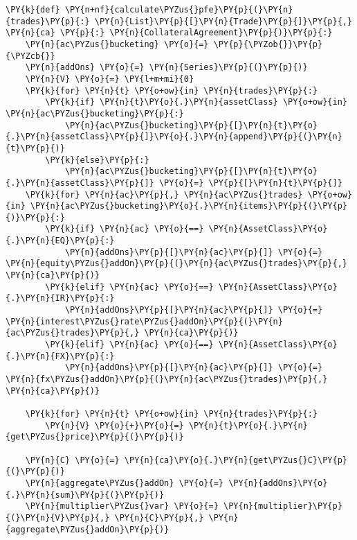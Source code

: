     \begin{tcolorbox}[breakable, size=fbox, boxrule=1pt, pad at break*=1mm,colback=cellbackground, colframe=cellborder]
\begin{Verbatim}[commandchars=\\\{\}]
\PY{k}{def} \PY{n+nf}{calculate\PYZus{}pfe}\PY{p}{(}\PY{n}{trades}\PY{p}{:} \PY{n}{List}\PY{p}{[}\PY{n}{Trade}\PY{p}{]}\PY{p}{,} \PY{n}{ca} \PY{p}{:} \PY{n}{CollateralAgreement}\PY{p}{)}\PY{p}{:}
    \PY{n}{ac\PYZus{}bucketing} \PY{o}{=} \PY{p}{\PYZob{}}\PY{p}{\PYZcb{}}
    \PY{n}{addOns} \PY{o}{=} \PY{n}{Series}\PY{p}{(}\PY{p}{)}
    \PY{n}{V} \PY{o}{=} \PY{l+m+mi}{0}
    \PY{k}{for} \PY{n}{t} \PY{o+ow}{in} \PY{n}{trades}\PY{p}{:}
        \PY{k}{if} \PY{n}{t}\PY{o}{.}\PY{n}{assetClass} \PY{o+ow}{in} \PY{n}{ac\PYZus{}bucketing}\PY{p}{:}
            \PY{n}{ac\PYZus{}bucketing}\PY{p}{[}\PY{n}{t}\PY{o}{.}\PY{n}{assetClass}\PY{p}{]}\PY{o}{.}\PY{n}{append}\PY{p}{(}\PY{n}{t}\PY{p}{)}
        \PY{k}{else}\PY{p}{:}
            \PY{n}{ac\PYZus{}bucketing}\PY{p}{[}\PY{n}{t}\PY{o}{.}\PY{n}{assetClass}\PY{p}{]} \PY{o}{=} \PY{p}{[}\PY{n}{t}\PY{p}{]}
    \PY{k}{for} \PY{n}{ac}\PY{p}{,} \PY{n}{ac\PYZus{}trades} \PY{o+ow}{in} \PY{n}{ac\PYZus{}bucketing}\PY{o}{.}\PY{n}{items}\PY{p}{(}\PY{p}{)}\PY{p}{:}
        \PY{k}{if} \PY{n}{ac} \PY{o}{==} \PY{n}{AssetClass}\PY{o}{.}\PY{n}{EQ}\PY{p}{:}
            \PY{n}{addOns}\PY{p}{[}\PY{n}{ac}\PY{p}{]} \PY{o}{=} \PY{n}{equity\PYZus{}addOn}\PY{p}{(}\PY{n}{ac\PYZus{}trades}\PY{p}{,} \PY{n}{ca}\PY{p}{)}
        \PY{k}{elif} \PY{n}{ac} \PY{o}{==} \PY{n}{AssetClass}\PY{o}{.}\PY{n}{IR}\PY{p}{:}
            \PY{n}{addOns}\PY{p}{[}\PY{n}{ac}\PY{p}{]} \PY{o}{=} \PY{n}{interest\PYZus{}rate\PYZus{}addOn}\PY{p}{(}\PY{n}{ac\PYZus{}trades}\PY{p}{,} \PY{n}{ca}\PY{p}{)}
        \PY{k}{elif} \PY{n}{ac} \PY{o}{==} \PY{n}{AssetClass}\PY{o}{.}\PY{n}{FX}\PY{p}{:}
            \PY{n}{addOns}\PY{p}{[}\PY{n}{ac}\PY{p}{]} \PY{o}{=} \PY{n}{fx\PYZus{}addOn}\PY{p}{(}\PY{n}{ac\PYZus{}trades}\PY{p}{,} \PY{n}{ca}\PY{p}{)}

    \PY{k}{for} \PY{n}{t} \PY{o+ow}{in} \PY{n}{trades}\PY{p}{:}
        \PY{n}{V} \PY{o}{+}\PY{o}{=} \PY{n}{t}\PY{o}{.}\PY{n}{get\PYZus{}price}\PY{p}{(}\PY{p}{)}
    
    \PY{n}{C} \PY{o}{=} \PY{n}{ca}\PY{o}{.}\PY{n}{get\PYZus{}C}\PY{p}{(}\PY{p}{)}
    \PY{n}{aggregate\PYZus{}addOn} \PY{o}{=} \PY{n}{addOns}\PY{o}{.}\PY{n}{sum}\PY{p}{(}\PY{p}{)}
    \PY{n}{multiplier\PYZus{}var} \PY{o}{=} \PY{n}{multiplier}\PY{p}{(}\PY{n}{V}\PY{p}{,} \PY{n}{C}\PY{p}{,} \PY{n}{aggregate\PYZus{}addOn}\PY{p}{)}
    

\end{Verbatim}
\end{tcolorbox}
